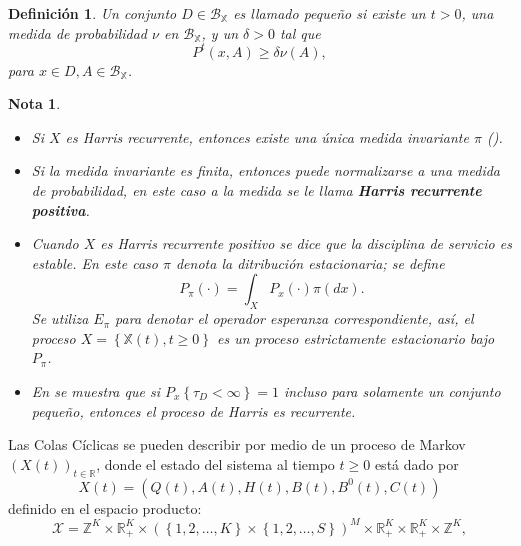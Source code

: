 \documentclass{article}
\newtheorem{Def}{Definición}[section]
\newtheorem{Note}{Nota}[section]
\newcommand{\rea}{\mathbb{R}}
\numberwithin{equation}{section}
\begin{document}
\begin{Def}
Un conjunto $D\in\mathcal{B}_\mathbb{X}$ es llamado peque\~no si existe un $t>0$, una medida de probabilidad $\nu$ en $\mathcal{B}_\mathbb{X}$, y un $\delta>0$ tal que \[P^{t}\left(x,A\right)\geq\delta\nu\left(A\right),\] para $x\in D,A\in\mathcal{B}_\mathbb{X}$.
\end{Def}
\begin{Note}
\begin{itemize}

\item[i)] Si $X$ es Harris recurrente, entonces existe una \'unica medida invariante $\pi$ (\cite{Getoor}).

\item[ii)] Si la medida invariante es finita, entonces puede normalizarse a una medida de probabilidad, en este caso a la medida se le llama \textbf{Harris recurrente positiva}.

\item[iii)] Cuando $X$ es Harris recurrente positivo se dice que la disciplina de servicio es estable. En este caso $\pi$ denota la ditribuci\'on estacionaria; se define \[P_{\pi}\left(\cdot\right)=\int_{X}P_{x}\left(\cdot\right)\pi\left(dx\right).\] Se utiliza $E_{\pi}$ para denotar el operador esperanza
correspondiente, as\'i, el proceso $X=\left\{\mathbb{X}\left(t\right),t\geq0\right\}$ es un proceso estrictamente estacionario bajo $P_{\pi}$.

\item[iv)] En \cite{MeynTweedie} se muestra que si $P_{x}\left\{\tau_{D}<\infty\right\}=1$ incluso para solamente un conjunto peque\~no, entonces el proceso de Harris es recurrente.
\end{itemize}
\end{Note}


Las Colas C\'iclicas se pueden describir por medio de un proceso de Markov $\left(X\left(t\right)\right)_{t\in\rea}$, donde el estado del sistema al tiempo $t\geq0$ est\'a dado por
\begin{equation}
X\left(t\right)=\left(Q\left(t\right),A\left(t\right),H\left(t\right),B\left(t\right),B^{0}\left(t\right),C\left(t\right)\right)
\end{equation}
definido en el espacio producto:
\begin{equation}
\mathcal{X}=\mathbb{Z}^{K}\times\rea_{+}^{K}\times\left(\left\{1,2,\ldots,K\right\}\times\left\{1,2,\ldots,S\right\}\right)^{M}\times\rea_{+}^{K}\times\rea_{+}^{K}\times\mathbb{Z}^{K},
\end{equation}
\end{document}

